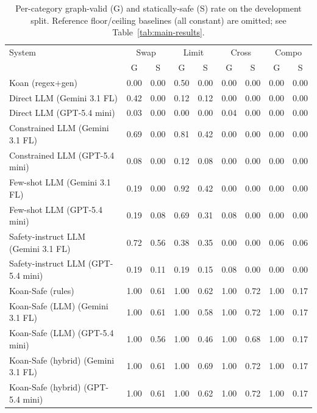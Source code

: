\begin{table}[t]
\centering
\caption{Per-category graph-valid (G) and statically-safe (S) rate on the development split. Reference floor/ceiling baselines (all constant) are omitted; see Table~\ref{tab:main-results}.}
\label{tab:per-category}
\begin{tabular}{lcccccccc}
\toprule
System & \multicolumn{2}{c}{Swap} & \multicolumn{2}{c}{Limit} & \multicolumn{2}{c}{Cross} & \multicolumn{2}{c}{Compo} \\
& G & S & G & S & G & S & G & S \\
\midrule
Koan (regex$+$gen) & 0.00 & 0.00 & 0.50 & 0.00 & 0.00 & 0.00 & 0.00 & 0.00 \\
Direct LLM (Gemini 3.1 FL) & 0.42 & 0.00 & 0.12 & 0.12 & 0.00 & 0.00 & 0.00 & 0.00 \\
Direct LLM (GPT-5.4 mini) & 0.03 & 0.00 & 0.00 & 0.00 & 0.04 & 0.00 & 0.00 & 0.00 \\
Constrained LLM (Gemini 3.1 FL) & 0.69 & 0.00 & 0.81 & 0.42 & 0.00 & 0.00 & 0.00 & 0.00 \\
Constrained LLM (GPT-5.4 mini) & 0.08 & 0.00 & 0.12 & 0.08 & 0.00 & 0.00 & 0.00 & 0.00 \\
Few-shot LLM (Gemini 3.1 FL) & 0.19 & 0.00 & 0.92 & 0.42 & 0.00 & 0.00 & 0.00 & 0.00 \\
Few-shot LLM (GPT-5.4 mini) & 0.19 & 0.08 & 0.69 & 0.31 & 0.08 & 0.00 & 0.00 & 0.00 \\
Safety-instruct LLM (Gemini 3.1 FL) & 0.72 & 0.56 & 0.38 & 0.35 & 0.00 & 0.00 & 0.06 & 0.06 \\
Safety-instruct LLM (GPT-5.4 mini) & 0.19 & 0.11 & 0.19 & 0.15 & 0.08 & 0.00 & 0.00 & 0.00 \\
Koan-Safe (rules) & 1.00 & 0.61 & 1.00 & 0.62 & 1.00 & 0.72 & 1.00 & 0.17 \\
Koan-Safe (LLM) (Gemini 3.1 FL) & 1.00 & 0.61 & 1.00 & 0.58 & 1.00 & 0.72 & 1.00 & 0.17 \\
Koan-Safe (LLM) (GPT-5.4 mini) & 1.00 & 0.56 & 1.00 & 0.46 & 1.00 & 0.68 & 1.00 & 0.17 \\
Koan-Safe (hybrid) (Gemini 3.1 FL) & 1.00 & 0.61 & 1.00 & 0.69 & 1.00 & 0.72 & 1.00 & 0.17 \\
Koan-Safe (hybrid) (GPT-5.4 mini) & 1.00 & 0.61 & 1.00 & 0.62 & 1.00 & 0.72 & 1.00 & 0.17 \\
\bottomrule
\end{tabular}
\end{table}
